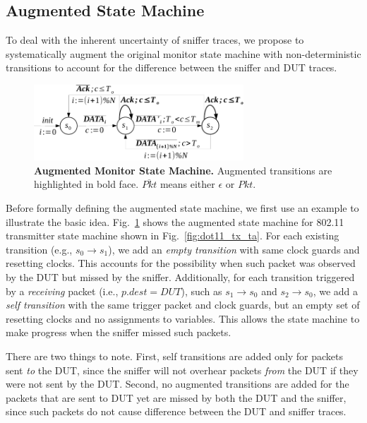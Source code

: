 \subsection{Augmented State Machine}
\label{subsec:augment}

To deal with the inherent uncertainty of sniffer traces, we propose to
systematically augment the original monitor state machine with non-deterministic
transitions to account for the difference between the sniffer and DUT traces.

\begin{figure}[H]
  \centering
  \vspace*{-5mm}
  \includegraphics[width=0.7\textwidth]{./figures/dot11_tx_checker.pdf}
  \caption{\textbf{Augmented Monitor State Machine.} Augmented transitions are
  highlighted in bold face. $\overline{Pkt}$ means either $\epsilon$ or $Pkt$.}
  \label{fig:augment}
  \vspace*{-8mm}
\end{figure}

Before formally defining the augmented state machine, we first use an example to
illustrate the basic idea. Fig.~\ref{fig:augment} shows the augmented state
machine for 802.11 transmitter state machine shown in
Fig.~\ref{fig:dot11_tx_ta}.  For each existing transition (e.g., $s_0\rightarrow
s_1$), we add an \textit{empty transition} with same clock guards and resetting
clocks.  This accounts for the possibility when such packet was observed by
the DUT but missed by the sniffer.  Additionally, for each transition triggered
by a \textit{receiving} packet (i.e., $p.dest = DUT$), such as $s_1\rightarrow
s_0$ and $s_2\rightarrow s_0$, we add a \textit{self transition} with the same
trigger packet and clock guards, but an empty set of resetting clocks and no
assignments to variables. This allows the state machine to make progress when the sniffer missed such packets.

There are two things to note. First, self transitions are added only for
packets sent \textit{to} the DUT, since the sniffer will not overhear packets
\textit{from} the DUT if they were not sent by the DUT. Second, no augmented
transitions are added for the packets that are sent to DUT yet are missed by both
the DUT and the sniffer, since such packets do not cause difference between the
DUT and sniffer traces.

